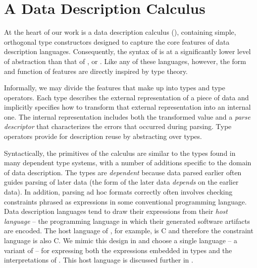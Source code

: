 \section{A Data Description Calculus}
\label{sec:ddc}

At the heart of our work is a data description calculus (\ddc{}),
containing simple, orthogonal type constructors designed to capture
the core features of data description languages.  Consequently, the
syntax of \ddc{} is at a significantly lower level of abstraction than
that of \padsc{}, \padsml{} or \ipads.  Like any of these languages, 
however, the form and function of \ddc{} features are directly 
inspired by type theory.  

Informally, we may divide the features that make up \ddc{} into types and
type operators. Each \ddc{} type describes the external representation
of a piece of data and implicitly specifies how to transform that
external representation into an internal one.  The internal
representation includes both the transformed value and a \textit{parse
  descriptor} that characterizes the errors that occurred during
parsing. Type operators provide for description reuse by abstracting
over types.

Syntactically, the primitives of the calculus are similar to the types
found in many dependent type systems, with a number of additions
specific to the domain of data description.  The types are {\em dependent} 
because data parsed earlier often guides parsing of later data
(\ie the form of the later data {\em depends} on the earlier data).
In addition, parsing ad hoc formats correctly
often involves checking constraints 
phrased as expressions in some conventional programming language.
%
%
Data description languages tend to draw their expressions
from their {\em host language} -- the programming language in which
their generated software artifacts are encoded.  The host language of
\padsc{}, for example, is C and therefore the \padsc{} constraint
language is also C.  We mimic this design in
\ddc{} and choose a single language -- a variant of \fomega -- for
expressing both the expressions embedded in types and the
interpretations of \ddc. This host language is discussed further in
.

